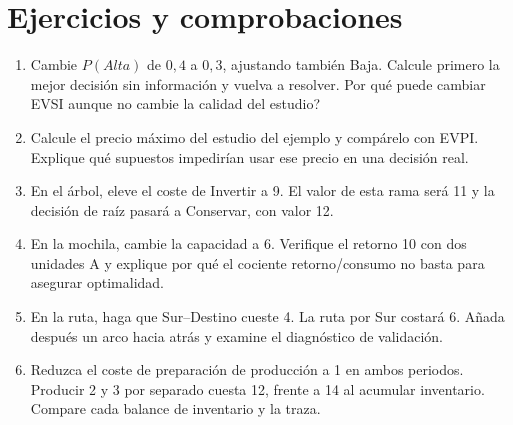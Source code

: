 \section{Ejercicios y comprobaciones}
\begin{enumerate}
 \item Cambie $P(Alta)$ de $0{,}4$ a $0{,}3$, ajustando también Baja.
 Calcule primero la mejor decisión sin información y vuelva a resolver.
 \textquestiondown{}Por qué puede cambiar EVSI aunque no cambie la calidad del estudio?
 \item Calcule el precio máximo del estudio del ejemplo y compárelo con EVPI.
 Explique qué supuestos impedirían usar ese precio en una decisión real.
 \item En el árbol, eleve el coste de Invertir a 9. El valor de esta rama será
 11 y la decisión de raíz pasará a Conservar, con valor 12.
 \item En la mochila, cambie la capacidad a 6. Verifique el retorno 10 con
 dos unidades A y explique por qué el cociente retorno/consumo no basta para
 asegurar optimalidad.
 \item En la ruta, haga que Sur--Destino cueste 4. La ruta por Sur costará 6.
 Añada después un arco hacia atrás y examine el diagnóstico de validación.
 \item Reduzca el coste de preparación de producción a 1 en ambos periodos.
 Producir 2 y 3 por separado cuesta 12, frente a 14 al acumular inventario.
 Compare cada balance de inventario y la traza.
\end{enumerate}
